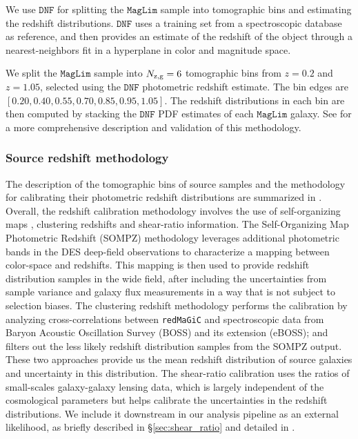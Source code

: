 \documentclass[aps, prd,twocolumn,superscriptaddress,nofootinbib,preprintnumbers]{revtex4-1}
\newcommand{\redmagic}{\texttt{redMaGiC} }
\newcommand{\maglim}{\texttt{MagLim} }
\begin{document}
We use $\texttt{DNF}$ for splitting the $\maglim$ sample into tomographic bins and estimating the redshift distributions. $\texttt{DNF}$  uses a training set from a spectroscopic database as reference, and then provides an estimate of the redshift of the object through a nearest-neighbors fit in a hyperplane in color and magnitude space.

We split the $\maglim$ sample into $N_{\rm z,g} = 6$ tomographic bins from $z=0.2$ and $z=1.05$, selected using the $\texttt{DNF}$ photometric redshift estimate. The bin edges are $[0.20, 0.40, 0.55, 0.70, 0.85, 0.95, 1.05]$. The redshift distributions in each bin are then computed by stacking the $\texttt{DNF}$ PDF estimates of each $\maglim$ galaxy. See \cite{y3-2x2ptaltlensresults} for a more comprehensive description and validation of this methodology.

\subsubsection{Source redshift methodology}
\label{sec:sourcez}
The description of the tomographic bins of source samples and the methodology for calibrating their photometric redshift distributions are summarized in \citet*{y3-sompz}. Overall, the redshift calibration methodology involves the use of self-organizing maps \citep{y3-sompz}, clustering redshifts \citep{y3-sourcewz} and shear-ratio \citep{y3-shearratio} information. The Self-Organizing Map Photometric Redshift (SOMPZ) methodology leverages additional photometric bands in the DES deep-field observations \citep{y3-deepfields} to characterize a mapping between color-space and redshifts. This mapping is then used to provide redshift distribution samples in the wide field, after including the uncertainties from sample variance and galaxy flux measurements in a way that is not subject to selection biases. The clustering redshift methodology performs the calibration by analyzing cross-correlations between \redmagic and spectroscopic data from Baryon Acoustic Oscillation Survey (BOSS) and its extension (eBOSS); and filters out the less likely redshift distribution samples from the SOMPZ output. These two approaches provide us the mean redshift distribution of source galaxies and uncertainty in this distribution. The shear-ratio calibration uses the ratios of small-scales galaxy-galaxy lensing data, which is largely independent of the cosmological parameters but helps calibrate the uncertainties in the redshift distributions. We include it downstream in our analysis pipeline as an external likelihood, as briefly described in \S\ref{sec:shear_ratio} and detailed in \citet*{y3-shearratio}. 
\end{document}

